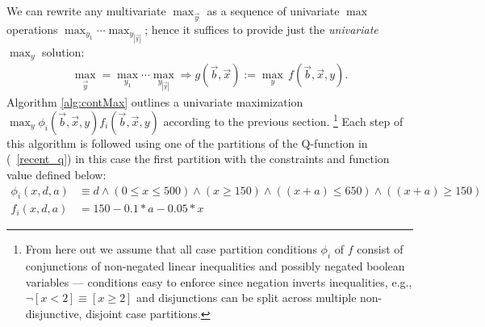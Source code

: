 \documentclass[twoside,11pt]{article}
\begin{document}
We can
rewrite any multivariate $\max_{\vec{y}}$ as a sequence of univariate
$\max$ operations $\max_{y_1} \cdots \max_{y_{|\vec{y}|}}$; hence it
suffices to provide just the \emph{univariate} $\max_y$ solution:
\begin{align}
\max_{\vec{y}} =\max_{y_1} \cdots \max_{y_{|\vec{y}|}} \Rightarrow g(\vec{b},\vec{x}) := \max_{y} \, f(\vec{b},\vec{x},y). \nonumber
\end{align}
Algorithm \ref{alg:contMax} outlines a univariate maximization  
$\max_y \phi_i(\vec{b},\vec{x},y) f_i(\vec{b},\vec{x},y)$ according to the previous section. 
\footnote{From here out we assume that all case partition conditions $\phi_i$ of
$f$ consist of conjunctions of non-negated linear inequalities and
possibly negated boolean variables --- conditions easy to enforce
since negation inverts inequalities, e.g., $\neg [x < 2] \equiv [x \geq 2]$
and disjunctions can be split across multiple non-disjunctive, 
disjoint case partitions.} 
Each step of this algorithm is followed using one of the partitions of the Q-function in (~\ref{recent_q}) in this case the first partition with the constraints and function value defined below: 
\begin{align*}
\phi_i(x,d,a) &\equiv d \land (0 \leq x \leq 500) \land (x \geq 150) \land ((x+a) \leq 650) \land ((x+a) \geq 150) \\
f_i(x,d,a) &= 150 - 0.1 * a - 0.05 * x
\end{align*}
\end{document}
